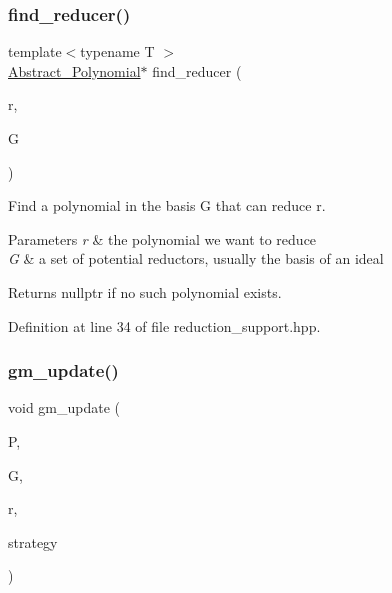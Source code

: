 \subsubsection{\texorpdfstring{find\+\_\+reducer()}{find\_reducer()}}
{\footnotesize\ttfamily template$<$typename T $>$ \\
\hyperlink{group__polygroup_class_abstract___polynomial}{Abstract\+\_\+\+Polynomial}$\ast$ find\+\_\+reducer (\begin{DoxyParamCaption}\item[{\hyperlink{group__polygroup_class_abstract___polynomial}{Abstract\+\_\+\+Polynomial} $\ast$}]{r,  }\item[{const T \&}]{G }\end{DoxyParamCaption})}



Find a polynomial in the basis {\ttfamily G} that can reduce {\ttfamily r}. 


\begin{DoxyParams}{Parameters}
{\em r} & the polynomial we want to reduce \\
\hline
{\em G} & a set of potential reductors, usually the basis of an ideal \\
\hline
\end{DoxyParams}
\begin{DoxyReturn}{Returns}
nullptr if no such polynomial exists. 
\end{DoxyReturn}


Definition at line 34 of file reduction\+\_\+support.\+hpp.

\mbox{\label{group___g_b_computation_ga6d6b548c0ff0a14d51638f7413cca879}} 
\subsubsection{\texorpdfstring{gm\+\_\+update()}{gm\_update()}}
{\footnotesize\ttfamily void gm\+\_\+update (\begin{DoxyParamCaption}\item[{list$<$ \hyperlink{group___g_b_computation_class_critical___pair___basic}{Critical\+\_\+\+Pair\+\_\+\+Basic} $\ast$$>$ \&}]{P,  }\item[{list$<$ \hyperlink{group__polygroup_class_abstract___polynomial}{Abstract\+\_\+\+Polynomial} $\ast$$>$ \&}]{G,  }\item[{\hyperlink{group__polygroup_class_abstract___polynomial}{Abstract\+\_\+\+Polynomial} $\ast$}]{r,  }\item[{\hyperlink{group__strategygroup_ga0ee6c8e033547330e6b89929730007f4}{Strategy\+Flags}}]{strategy }\end{DoxyParamCaption})}



